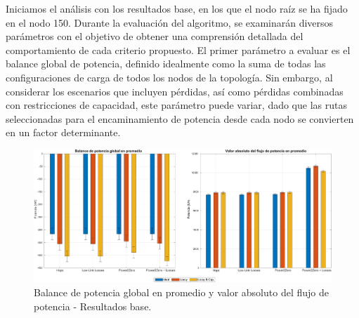 Iniciamos el análisis con los resultados base, en los que el nodo raíz se ha fijado en el nodo 150. Durante la evaluación del algoritmo, se examinarán diversos parámetros con el objetivo de obtener una comprensión detallada del comportamiento de cada criterio propuesto. El primer parámetro a evaluar es el balance global de potencia, definido idealmente como la suma de todas las configuraciones de carga de todos los nodos de la topología. Sin embargo, al considerar los escenarios que incluyen pérdidas, así como pérdidas combinadas con restricciones de capacidad, este parámetro puede variar, dado que las rutas seleccionadas para el encaminamiento de potencia desde cada nodo se convierten en un factor determinante.



\begin{figure}[ht!]
    \centering
    \includegraphics[width=\textwidth]{fig/07_bloste/bloste_08.pdf}
    \caption{Balance de potencia global en promedio y valor absoluto del flujo de potencia - Resultados base.}
    \label{fig:fig_base_global_powers}
\end{figure}


